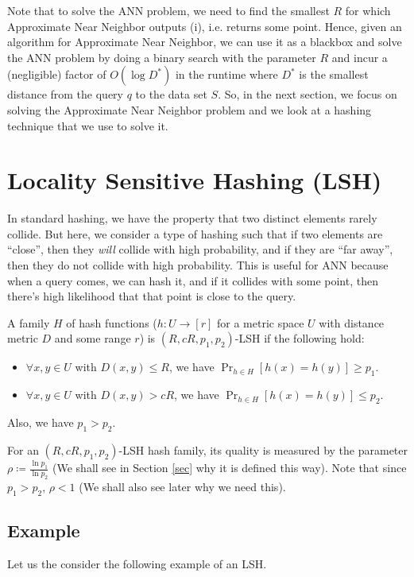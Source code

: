 \documentclass[11pt]{article}
\begin{document}
Note that to solve the {\sc ANN} problem, we need to find the smallest $R$ for which {\sc Approximate Near Neighbor} outputs (i), i.e. returns some point. Hence, given an algorithm for {\sc Approximate Near Neighbor}, we can use it as a blackbox and solve the {\sc ANN} problem by doing a binary search with the parameter $R$ and incur a (negligible) factor of $O(\log D^*)$ in the runtime where $D^*$ is the smallest distance from the query $q$ to the data set $S$.  So, in the next section, we focus on solving the {\sc Approximate Near Neighbor} problem and we look at a hashing technique that we use to solve it.

\section{Locality Sensitive Hashing (LSH)}

In standard hashing, we have the property that two distinct elements rarely collide. But here, we consider a type of hashing such that if two elements are ``close'', then they \emph{will} collide with high probability, and if they are ``far away'', then they do not collide with high probability. This is useful for {\sc ANN} because when a query comes, we can hash it, and if it collides with some point, then there's high likelihood that that point is close to the query. 

\begin{definition} A family $H$ of hash functions ($h:U\to [r]$ for a metric space $U$ with distance metric $D$ and some range $r$) is $(R,cR,p_1,p_2)$-LSH if the following hold:
\begin{itemize}
    \item $\forall x,y\in U$ with $D(x,y)\leq R$, we have $\Pr_{h\in H}[h(x)=h(y)] \geq p_1$.
    \item $\forall x,y\in U$ with $D(x,y)> cR$, we have $\Pr_{h\in H}[h(x)=h(y)] \leq p_2$.
\end{itemize}
Also, we have $p_1>p_2$.
\end{definition} 

For an $(R,cR,p_1,p_2)$-LSH hash family, its quality is measured by the parameter $\rho\coloneqq\frac{\ln p_1}{\ln p_2}$ (We shall see in Section \ref{sec} why it is defined this way). Note that since $p_1>p_2$, $\rho<1$ (We shall also see later why we need this).  

\subsection*{Example}
Let us the consider the following example of an LSH.
\end{document}
